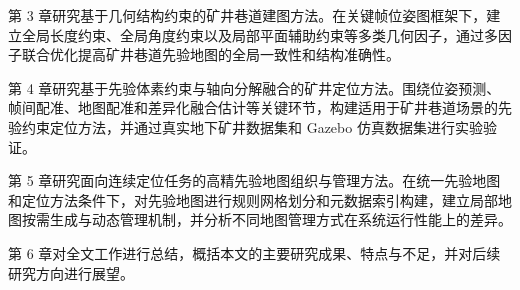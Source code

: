 第 3 章研究基于几何结构约束的矿井巷道建图方法。在关键帧位姿图框架下，建立全局长度约束、全局角度约束以及局部平面辅助约束等多类几何因子，通过多因子联合优化提高矿井巷道先验地图的全局一致性和结构准确性。

第 4 章研究基于先验体素约束与轴向分解融合的矿井定位方法。围绕位姿预测、帧间配准、地图配准和差异化融合估计等关键环节，构建适用于矿井巷道场景的先验约束定位方法，并通过真实地下矿井数据集和 Gazebo 仿真数据集进行实验验证。

第 5 章研究面向连续定位任务的高精先验地图组织与管理方法。在统一先验地图和定位方法条件下，对先验地图进行规则网格划分和元数据索引构建，建立局部地图按需生成与动态管理机制，并分析不同地图管理方式在系统运行性能上的差异。

第 6 章对全文工作进行总结，概括本文的主要研究成果、特点与不足，并对后续研究方向进行展望。
